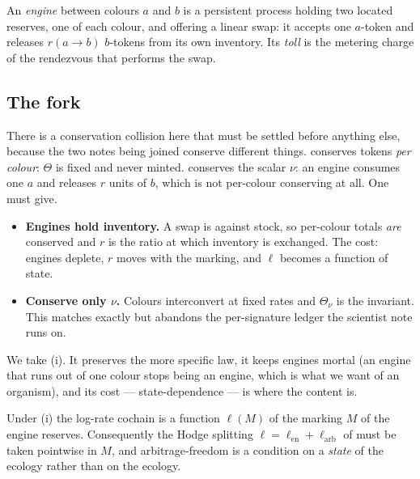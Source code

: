 \begin{definition}[Engine]\label{eng:def:engine}
An \emph{engine} between colours $a$ and $b$ is a persistent process
holding two located reserves, one of each colour, and offering a linear
swap: it accepts one $a$-token and releases $r(a{\to}b)$ $b$-tokens from
its own inventory. Its \emph{toll} is the metering charge of the rendezvous
that performs the swap.
\end{definition}

\subsection{The fork}\label{eng:S3.2}

There is a conservation collision here that must be settled before
anything else, because the two notes being joined conserve different
things. \chComp conserves tokens \emph{per colour}: $\Theta$ is
fixed and never minted. \cite{vtok} conserves the scalar $\nu$: an engine
consumes one $a$ and releases $r$ units of $b$, which is not per-colour
conserving at all. One must give.

\begin{itemize}[itemsep=3pt]
\item[(i)] \textbf{Engines hold inventory.} A swap is against stock, so
per-colour totals \emph{are} conserved and $r$ is the ratio at which
inventory is exchanged. The cost: engines deplete, $r$ moves with the
marking, and $\ell$ becomes a function of state.
\item[(ii)] \textbf{Conserve only $\nu$.} Colours interconvert at fixed
rates and $\Theta_\nu$ is the invariant. This matches \cite{vtok} exactly
but abandons the per-signature ledger the scientist note runs on.
\end{itemize}

We take (i). It preserves the more specific law, it keeps engines mortal
(an engine that runs out of one colour stops being an engine, which is what
we want of an organism), and its cost --- state-dependence --- is where the
content is.

\begin{proposition}\label{eng:prop:marking}
Under (i) the log-rate cochain is a function $\ell(M)$ of the marking $M$
of the engine reserves. Consequently the Hodge splitting
$\ell = \ell_{\mathrm{en}} + \ell_{\mathrm{arb}}$ of \cite[\S4]{vtok} must
be taken pointwise in $M$, and arbitrage-freedom is a condition on a
\emph{state} of the ecology rather than on the ecology.
\end{proposition}

